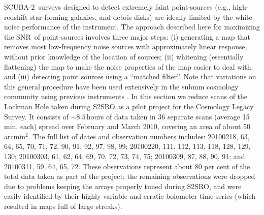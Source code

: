\documentclass[useAMS,usenatbib,nofootinbib]{mn2e}
\newcommand{\snr}{SNR}
\newcommand{\scuba}{SCUBA-2}
\begin{document}
\scuba\ surveys designed to detect extremely faint point-sources
(e.g., high-redshift star-forming galaxies, and debris disks) are
ideally limited by the white-noise performance of the instrument. The
approach described here for maximizing the \snr\ of point-sources
involves three major steps: (i) generating a map that removes most
low-frequency noise sources with approximately linear response,
without prior knowledge of the location of sources; (ii) whitening
(essentially flattening) the map to make the noise properties of the
map easier to deal with; and (iii) detecting point sources using a
``matched filter''. Note that variations on this general procedure
have been used extensively in the submm cosmology community using
previous instruments
\citep[e.g.,][]{scott2002,borys2003,laurent2005,coppin2006,scott2008,perera2008,devlin2009}.
In this section we reduce scans of the Lockman Hole taken during S2SRO
as a pilot project for the Cosmology Legacy Survey. It consists of
$\sim8.5$\,hours of data taken in 36 separate scans (average
15\,min. each) spread over February and March 2010, covering an area
of about 50\,arcmin$^2$. The full list of dates and observation
numbers includes: 20100218, 63, 64, 65, 70, 71, 72, 90, 91, 92, 97,
98, 99; 20100220, 111, 112, 113, 118, 128, 129, 130; 20100303, 61, 62,
64, 69, 70, 72, 73, 74, 75; 20100309, 87, 88, 90, 91; and 20100311,
59, 64, 65, 72. These observations represent about 80 per cent of the
total data taken as part of the project; the remaining observations
were dropped due to problems keeping the arrays properly tuned during
S2SRO, and were easily identified by their highly variable and erratic
bolometer time-series (which resulted in maps full of large streaks).
\end{document}
